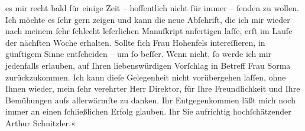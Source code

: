\begin{ledgroupsized}[t]{13cm}
               es mir recht bald für einige Zeit – hoffentlich nicht für immer – ſenden zu wollen.
               Ich möchte es ſehr gern \label{K_L00403_1v}\label{K_L00403_1h} zeigen und kann die neue Abſchrift,
               die ich mir wieder nach meinem ſehr ſchlecht leſerlichen Manuſkript anfertigen laſſe,
               erſt im Laufe der nächſten Woche erhalten. Sollte ſich Frau Hohenfels intereſſieren, in günſtigem Sinne entſcheiden – um ſo
               beſſer. Wenn nicht, ſo werde ich mir jedenfalls erlauben, auf Ihren liebenswürdigen
               Vorſchlag in Betreff Frau Sorma zurückzukommen.
               Ich kann dieſe Gelegenheit nicht vorübergehen laſſen, ohne Ihnen wieder, mein ſehr
               verehrter Herr Direktor, für Ihre Freundlichkeit und Ihre Bemühungen aufs
               allerwärmſte zu danken. Ihr Entgegenkommen läßt mich noch immer an einen
               ſchließlichen Erfolg glauben. Ihr Sie aufrichtig hochſchätzender Arthur
               Schnitzler.«\pend
           
         
         \endnumbering{}\end{ledgroupsized}  \newcommand{\dateiname}{L00403}\newcommand{\titel}{Arthur Schnitzler an Max Burckhard, 21. 11. 1894}\newcommand{\editorInnen}{Martin Anton Müller und Gerd-Hermann Susen}
      